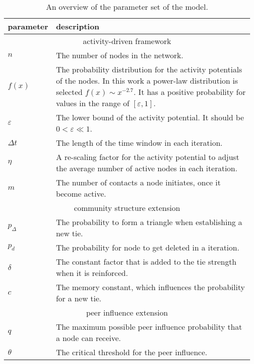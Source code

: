 \begin{table}[]
\centering
\begin{tabular}{lp{10cm}}
\hline
\textbf{parameter} & \textbf{description} \\ \hline \hline
\multicolumn{2}{c}{activity-driven framework} \\ \hline
\( n \) & The number of nodes in the network. \\
\( f(x) \) & The probability distribution for the activity potentials of the nodes. In this work a power-law distribution is selected \( f(x) \sim x^{-2.7} \). It has a positive probability for values in the range of \( [\varepsilon, 1] \). \\
\( \varepsilon \) &  The lower bound of the activity potential. It should be \( 0 < \varepsilon \ll 1 \). \\
\( \Delta t \) &  The length of the time window in each iteration. \\
\( \eta \) &  A re-scaling factor for the activity potential to adjust the average number of active nodes in each iteration. \\
\( m \) & The number of contacts a node initiates, once it become active. \\ \hline \hline

\multicolumn{2}{c}{community structure extension} \\ \hline
\( p_{\Delta} \) & The probability to form a triangle when establishing a new tie. \\
\( p_{d} \) & The probability for node to get deleted in a iteration. \\
\( \delta \) & The constant factor that is added to the tie strength when it is reinforced. \\
\( c \) &  The memory constant, which influences the probability for a new tie.\\ \hline \hline

\multicolumn{2}{c}{peer influence extension} \\
\( q \) & The maximum possible peer influence probability that a node can receive. \\
\( \theta \) & The critical threshold for the peer influence.  \\ \hline
\end{tabular}

\caption{An overview of the parameter set of the model.}
\label{tbl:all-model-parameter}
\end{table}
